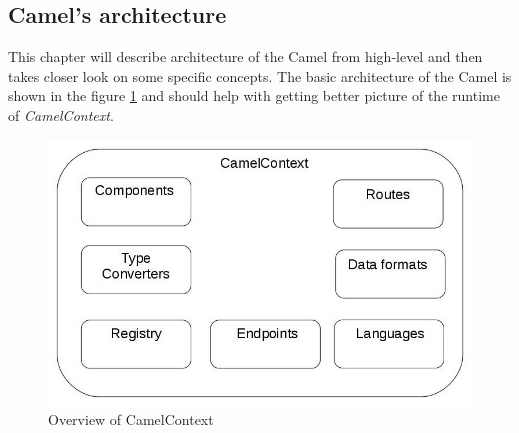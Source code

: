 \documentclass[12pt,final,oneside]{fithesis2}
\begin{document}
\subsection{Camel's architecture}
This chapter will describe architecture of the Camel from high-level and then takes closer look on some specific concepts. The basic architecture of the Camel is shown in the figure \ref{camelContext} and should help with getting better picture of the runtime of \textit{CamelContext}.

\begin{figure}[!h]
\centering
\includegraphics[width=0.9\linewidth]{images/CamelContextCrop.jpg}
\caption{Overview of CamelContext}
\label{camelContext}
\end{figure}
\end{document}
